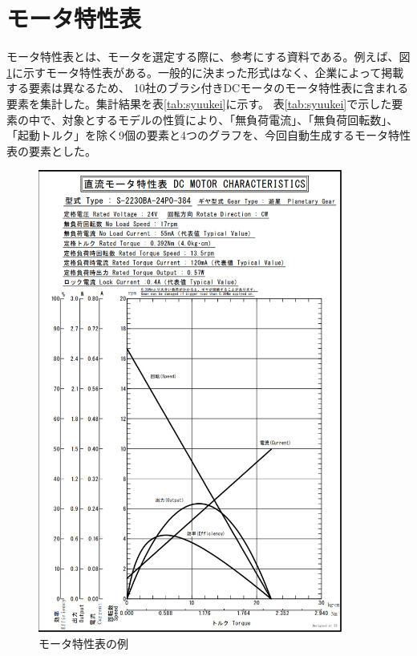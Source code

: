 \section{モータ特性表}\label{mortoku}
モータ特性表とは、モータを選定する際に、参考にする資料である\cite{仕様の見方}。例えば、図\ref{fig:rei_mortoku}に示すモータ特性表がある。一般的に決まった形式はなく、企業によって掲載する要素は異なるため、
10社のブラシ付きDCモータのモータ特性表\cite{特性表1,特性表2,特性表3,特性表4,特性表5,特性表6,特性表7,特性表8,特性表9,特性表10}に含まれる要素を集計した。集計結果を表\ref{tab:syuukei}に示す。
表\ref{tab:syuukei}で示した要素の中で、対象とするモデルの性質により、「無負荷電流」、「無負荷回転数」、「起動トルク」を除く9個の要素と4つのグラフを、今回自動生成するモータ特性表の要素とした。
	\begin{figure}[t]
		\centering
		\includegraphics[width=10cm]{./Image/rei_mortoku.png}
		\caption{モータ特性表の例}
		\label{fig:rei_mortoku}
	  \end{figure} 

